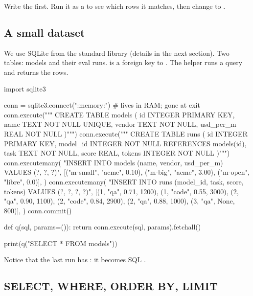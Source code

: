 \begin{trap}
Write the  first. Run it as a  to see which rows it matches, then
change  to .
\end{trap}

\subsection{A small dataset}

We use SQLite from the standard library (details in the next section). Two tables: models
and their eval runs.  is a foreign key to . The helper
 runs a query and returns the rows.

\begin{pycode}
import sqlite3

conn = sqlite3.connect(":memory:")       # lives in RAM; gone at exit
conn.execute("""
CREATE TABLE models (
    id        INTEGER PRIMARY KEY,
    name      TEXT NOT NULL UNIQUE,
    vendor    TEXT NOT NULL,
    usd_per_m REAL NOT NULL
)""")
conn.execute("""
CREATE TABLE runs (
    id       INTEGER PRIMARY KEY,
    model_id INTEGER NOT NULL REFERENCES models(id),
    task     TEXT NOT NULL,
    score    REAL,
    tokens   INTEGER NOT NULL
)""")
conn.executemany(
    "INSERT INTO models (name, vendor, usd_per_m) VALUES (?, ?, ?)",
    [("m-small", "acme", 0.10), ("m-big", "acme", 3.00),
     ("m-open", "libre", 0.0)],
)
conn.executemany(
    "INSERT INTO runs (model_id, task, score, tokens) VALUES (?, ?, ?, ?)",
    [(1, "qa", 0.71, 1200), (1, "code", 0.55, 3000), (2, "qa", 0.90, 1100),
     (2, "code", 0.84, 2900), (2, "qa", 0.88, 1000), (3, "qa", None, 800)],
)
conn.commit()

def q(sql, params=()):
    return conn.execute(sql, params).fetchall()

print(q("SELECT * FROM models"))
\end{pycode}
\begin{rawcode}
\end{rawcode}

Notice that the last run has : it becomes SQL .

\subsection{SELECT, WHERE, ORDER BY, LIMIT}

